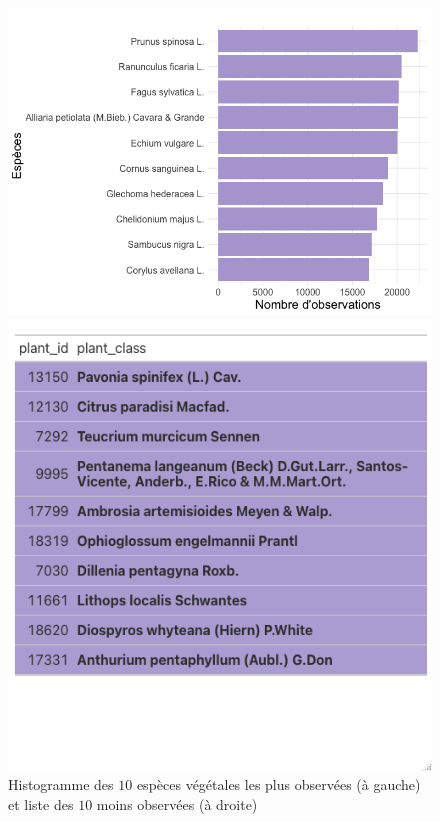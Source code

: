 \documentclass[a4paper,12pt]{article}
\begin{document}
\begin{figure}[H]
\centering
\begin{minipage}{0.55\textwidth}
  \includegraphics[width=\linewidth]{images/10_Most_Observed_Species.png}
\end{minipage}%
\hfill
\begin{minipage}{0.4\textwidth}
  \includegraphics[width=\linewidth]{images/10_Least_Observed_Species.png}
\end{minipage}
\caption{Histogramme des $10$ espèces végétales les plus observées (à gauche) et liste des $10$ moins observées (à droite)}
\end{figure}
\end{document}
